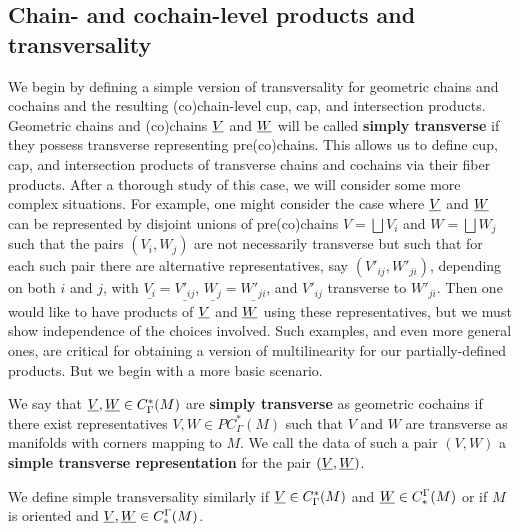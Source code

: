 \subsection{Chain- and cochain-level products and transversality}\label{S: chain products}

We begin by defining a simple version of transversality for geometric chains and cochains and the resulting (co)chain-level cup, cap, and intersection products. Geometric chains and (co)chains $\underline{V}$ and $\underline{W}$ will be called \textbf{simply transverse} if they possess transverse representing pre(co)chains. This allows us to define cup, cap, and intersection products of transverse chains and cochains via their fiber products. After a thorough study of this case, we will consider some more complex situations. For example, one might consider the case where $\underline{V}$ and $\underline{W}$ can be represented by disjoint unions of pre(co)chains $V = \bigsqcup V_i$ and $W = \bigsqcup W_j$ such that the pairs $(V_i,W_j)$ are not necessarily transverse but such that for each such pair there are alternative representatives, say $(V'_{ij},W'_{ji})$, depending on both $i$ and $j$, with $\underline{V_i} = \underline{V'_{ij}}$, $\underline{W_j} = \underline{W'_{ji}}$, and $V'_{ij}$ transverse to $W'_{ji}$. Then one would like to have products of $\underline{V}$ and $\underline{W}$ using these representatives, but we must show independence of the choices involved. Such examples, and even more general ones, are critical for obtaining a version of multilinearity for our partially-defined products. But we begin with a more basic scenario.

\begin{definition}\label{D: cochain trans}
	We say that $\underline{V}, \underline{W} \in C^*_{\Gamma}(M)$ are \textbf{simply transverse} as geometric cochains if there exist representatives $V,W \in PC^*_\Gamma(M)$ such that $V$ and $W$ are transverse as manifolds with corners mapping to $M$.
We call the data of such a pair $(V,W)$ a \textbf{simple transverse representation} for the pair $(\underline{V},\underline{W})$.

We define simple transversality similarly if $\underline{V} \in C^*_{\Gamma}(M)$ and $\underline{W} \in C_*^{\Gamma}(M)$ or if $M$ is oriented and $\underline{V}, \underline{W} \in C_*^{\Gamma}(M)$.
\end{definition}


